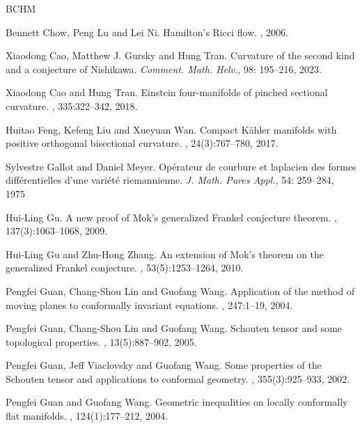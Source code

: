 \documentclass[12pt]{amsart}
\theoremstyle{plain}
\theoremstyle{definition}
\renewcommand{\>}{\rightarrow}
\numberwithin{equation}{section} %
\begin{document}
\begin{thebibliography}{BCHM}
	
	Bennett Chow, Peng Lu and Lei Ni.	
	\newblock  Hamilton's Ricci flow. 
	, 2006.
	
	Xiaodong Cao, Matthew J.  Gursky and Hung Tran.
Curvature of the second kind and a conjecture of Nishikawa. {\emph{Comment. Math. Helv.}},  98: 195--216, 2023.
	
	Xiaodong Cao and Hung Tran.
	\newblock Einstein four-manifolds of pinched sectional curvature.
	, 335:322--342, 2018.
	
	
	Huitao Feng, Kefeng Liu and Xueyuan Wan.
	\newblock Compact {K}\"{a}hler manifolds with positive orthogonal bisectional
	curvature.
	, 24(3):767--780, 2017.
	
	
	Sylvestre
	Gallot and Daniel Meyer.
	Opérateur de courbure et laplacien des formes différentielles d'une variété riemannienne. {\em{J. Math. Pures Appl.}}, 54: 259--284, 1975
	
	
	
	Hui-Ling Gu. 
	\newblock A new proof of Mok's generalized Frankel conjecture theorem. 
	, 137(3):1063--1068, 2009.
	
	Hui-Ling Gu and Zhu-Hong Zhang. 
	\newblock An extension of Mok's theorem on the generalized Frankel conjecture. 
	, 53(5):1253--1264, 2010.
	
	Pengfei Guan, Chang-Shou Lin and Guofang Wang.
	\newblock Application of the method of moving planes to conformally invariant equations.
	, 247:1--19, 2004.
	
	Pengfei Guan, Chang-Shou Lin and Guofang Wang. 
	\newblock Schouten tensor and some topological properties. 
	, 13(5):887--902, 2005.
	
	Pengfei Guan, Jeff Viaclovsky and Guofang Wang.
	\newblock Some properties of the Schouten tensor and applications to conformal geometry. 
	, 355(3):925--933, 2002.
	
	Pengfei Guan and Guofang Wang. 
	\newblock Geometric inequalities on locally conformally flat manifolds. 
	, 124(1):177--212, 2004.
	

\end{thebibliography}
\end{document}
